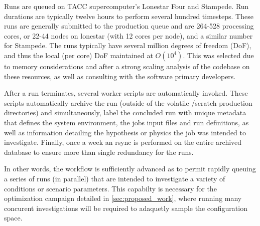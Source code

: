 Runs are queued on TACC\cite{tacc} supercomputer's 
Lonestar Four and Stampede. Run durations are typically 
twelve hours to perform several hundred timesteps. 
These runs are generally submitted to the production queue and are  
264-528 processing cores, 
or 22-44 nodes on lonestar (with 12 cores per node), and a similar number
for Stampede. The runs typically have several million degrees of freedom (DoF), 
and thus the local (per core) DoF maintained at $O(10^4)$. This was selected due to 
memory considerations and after a strong scaling analysis of the codebase on these 
resources, as well as consulting with the software primary developers. 

After a run terminates, several worker scripts are automatically invoked. 
These scripts automatically archive the run (outside of the volatile /scratch 
production directories) and simultaneously, label the concluded run with
unique metadata that defines the system environment, the jobs input
files and run definitions, as well as information detailing the
hypothesis or physics the job was intended to investigate. Finally, once
a week an rsync is performed on the entire archived database to ensure
more than single redundancy for the runs. 

In other words, the workflow is sufficiently advanced as to permit
rapidly queuing a series of runs (in parallel) that are intended to
investigate a variety of conditions or scenario parameters. This
capabilty is necessary for the optimization campaign detailed in
\ref{sec:proposed_work}, where running many concurent investigations
will be required to adaquetly sample the configuration space. 

